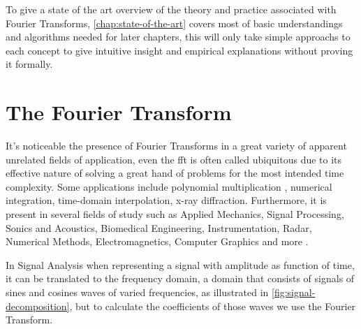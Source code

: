 \documentclass[
  oneside,
  11pt, a4paper,
  footinclude=true,
  headinclude=true,
  cleardoublepage=empty
]{scrbook}
\begin{document}
To give a state of the art overview of the theory and practice associated with Fourier Transforms, \autoref{chap:state-of-the-art} covers most of basic understandings and algorithms needed for later chapters, this will only take simple approachs to each concept to give intuitive insight and empirical explanations without proving it formally.





\chapter{The Fourier Transform} \label{chap:state-of-the-art}

It's noticeable the presence of Fourier Transforms in a great variety of apparent unrelated fields of application, even the \acrshort{fft} is often called ubiquitous due to its effective nature of solving a great hand of problems for the most intended time complexity. Some applications include polynomial multiplication \cite{jia2014polynomial}, numerical integration, time-domain interpolation, x-ray diffraction. Furthermore, it is present in several fields of study such as Applied Mechanics, Signal Processing, Sonics and Acoustics, Biomedical Engineering, Instrumentation, Radar, Numerical Methods, Electromagnetics, Computer Graphics and more \cite{brigham1988fast}.

In Signal Analysis when representing a signal with amplitude as function of time, it can be translated to the frequency domain, a domain that consists of signals of sines and cosines waves of varied frequencies, as illustrated in \autoref{fig:signal-decomposition}, but to calculate the coefficients of those waves we use the Fourier Transform.
\end{document}
